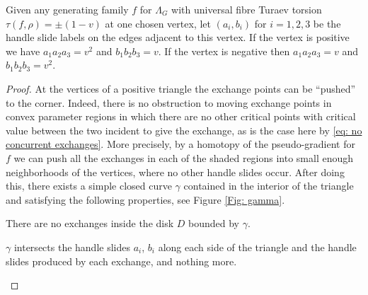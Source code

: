 \begin{lemma}\label{a3=v2 and b3=v}
Given any generating family $f$ for $\Lambda_G$ with universal fibre Turaev torsion $\tau(f,\rho)=\pm(1-v)$ at one chosen vertex, let $(a_i,b_i)$ for $i=1,2,3$ be the handle slide labels on the edges adjacent to this vertex. If the vertex is positive we have $a_1a_2a_3=v^2$ and $b_1b_2b_3=v$. If the vertex is negative then $a_1a_2a_3=v$ and $b_1b_2b_3=v^2$.
\end{lemma}

\begin{proof}
At the vertices of a positive triangle the exchange points can be ``pushed'' to the corner. Indeed, there is no obstruction to moving exchange points in convex parameter regions in which there are no other critical points with critical value between the two incident to give the exchange, as is the case here by \eqref{eq: no concurrent exchanges}. More precisely, by a homotopy of the pseudo-gradient for $f$ we can push all the exchanges in each of the shaded regions into small enough neighborhoods of the vertices, where no other handle slides occur. After doing this, there exists a simple closed curve $\gamma$ contained in the interior of the triangle and satisfying the following properties, see Figure \ref{Fig: gamma}.
\begin{enumeratea}
\item\label{enum:a}
There are no exchanges inside the disk $D$ bounded by $\gamma$.
\item\label{enum:b}
$\gamma$ intersects the handle slides $a_i$, $b_i$ along each side of the triangle and the handle slides produced by each exchange, and nothing more.
\end{enumeratea}

\begin{figure}[htbp]
\begin{center}
\end{center}
\end{figure}
\end{proof}
